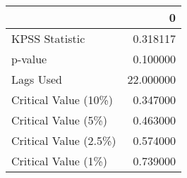 \begin{tabular}{lr}
\toprule
{} &          0 \\
\midrule
KPSS Statistic        &   0.318117 \\
p-value               &   0.100000 \\
Lags Used             &  22.000000 \\
Critical Value (10\%)  &   0.347000 \\
Critical Value (5\%)   &   0.463000 \\
Critical Value (2.5\%) &   0.574000 \\
Critical Value (1\%)   &   0.739000 \\
\bottomrule
\end{tabular}
